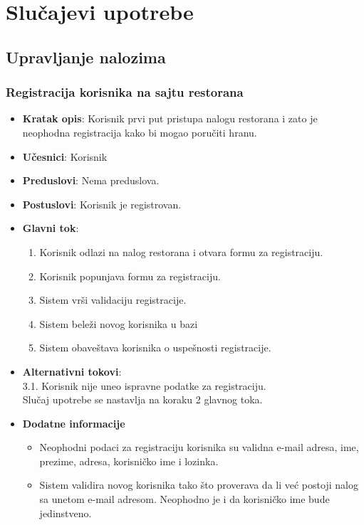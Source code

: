 \newpage
\section{Slu\v cajevi upotrebe}
\subsection{Upravljanje nalozima}
\subsubsection{Registracija korisnika na sajtu restorana}
\begin{itemize}
    \item \textbf{Kratak opis}:
    Korisnik prvi put pristupa nalogu restorana i zato je neophodna registracija kako bi mogao poručiti hranu.
    \item \textbf{Učesnici}:
    Korisnik
    \item \textbf{Preduslovi}:
    Nema preduslova. 
    \item \textbf{Postuslovi}:
    Korisnik je registrovan. 
    \item \textbf{Glavni tok}:
    \begin{enumerate}
        \item Korisnik odlazi na nalog restorana i otvara formu za registraciju.
        \item Korisnik popunjava formu za registraciju.
        \item Sistem vrši validaciju registracije.
        \item Sistem beleži novog korisnika u bazi
        \item Sistem obaveštava korisnika o uspešnosti registracije.
    \end{enumerate}
\end{itemize}

\begin {itemize}
\item \textbf {Alternativni tokovi}: \\
 3.1. Korisnik nije uneo ispravne podatke za registraciju.\\
 Slučaj upotrebe se nastavlja na koraku 2 glavnog toka.
\end{itemize}
 \begin{itemize} 
    \item \textbf{Dodatne informacije}
    \begin{itemize}
        \item Neophodni podaci za registraciju korisnika su validna e-mail adresa, ime, prezime, adresa, korisničko ime i lozinka.
        \item Sistem validira novog korisnika tako što proverava da li već postoji nalog sa unetom e-mail adresom. Neophodno je i da korisničko ime bude jedinstveno.
    \end{itemize}
\end{itemize}
 
